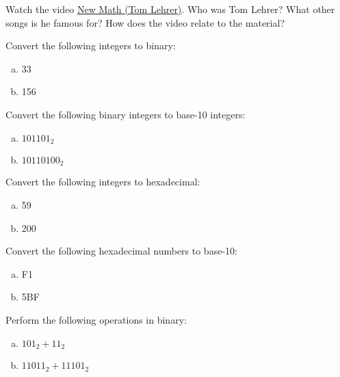 \documentclass[11pt,letterpaper]{article}
\begin{document}
\homework{}

 Watch the video \href{https://www.youtube.com/watch?v=UIKGV2cTgqA&ab_channel=JaredKhan}{New Math (Tom Lehrer)}. Who was Tom Lehrer? What other songs is he famous for? How does the video relate to the material? \pspace





\newpage





 Convert the following integers to binary:
        \begin{enumerate}[(a)]
        \item 33
        \item 156
        \end{enumerate}





\newpage





 Convert the following binary integers to base-10 integers:
        \begin{enumerate}[(a)]
        \item $101101_2$
        \item $10110100_2$
        \end{enumerate}





\newpage





 Convert the following integers to hexadecimal:
        \begin{enumerate}[(a)]
        \item 59
        \item 200
        \end{enumerate}





\newpage





 Convert the following hexadecimal numbers to base-10:
        \begin{enumerate}[(a)]
        \item F1
        \item 5BF
        \end{enumerate}





\newpage





 Perform the following operations in binary:
        \begin{enumerate}[(a)]
        \item $101_2 + 11_2$
        \item $11011_2 + 11101_2$
        \end{enumerate}
\end{document}
